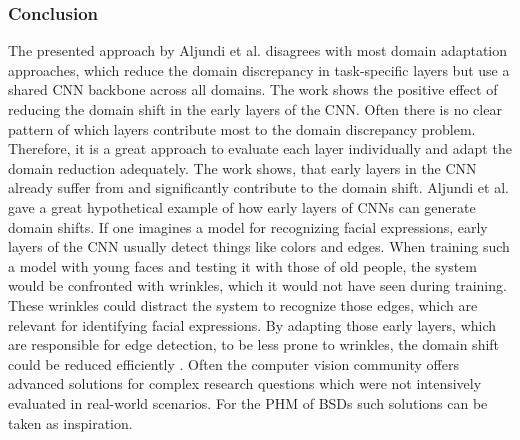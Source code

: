 \subsubsection{Conclusion}
The presented approach by Aljundi et al. \cite{Aljundi2016} disagrees with most domain adaptation approaches, which reduce the domain discrepancy in task-specific layers but use a shared CNN backbone across all domains. The work shows the positive effect of reducing the domain shift in the early layers of the CNN. Often there is no clear pattern of which layers contribute most to the domain discrepancy problem. Therefore, it is a great approach to evaluate each layer individually and adapt the domain reduction adequately. The work shows, that early layers in the CNN already suffer from and significantly contribute to the domain shift. Aljundi et al. \cite{Aljundi2016} gave a great hypothetical example of how early layers of CNNs can generate domain shifts. If one imagines a model for recognizing facial expressions, early layers of the CNN usually detect things like colors and edges. When training such a model with young faces and testing it with those of old people, the system would be confronted with wrinkles, which it would not have seen during training. These wrinkles could distract the system to recognize those edges, which are relevant for identifying facial expressions. By adapting those early layers, which are responsible for edge detection, to be less prone to wrinkles, the domain shift could be reduced efficiently \cite{Aljundi2016}. Often the computer vision community offers advanced solutions for complex research questions which were not intensively evaluated in real-world scenarios. For the PHM of BSDs such solutions can be taken as inspiration. 

